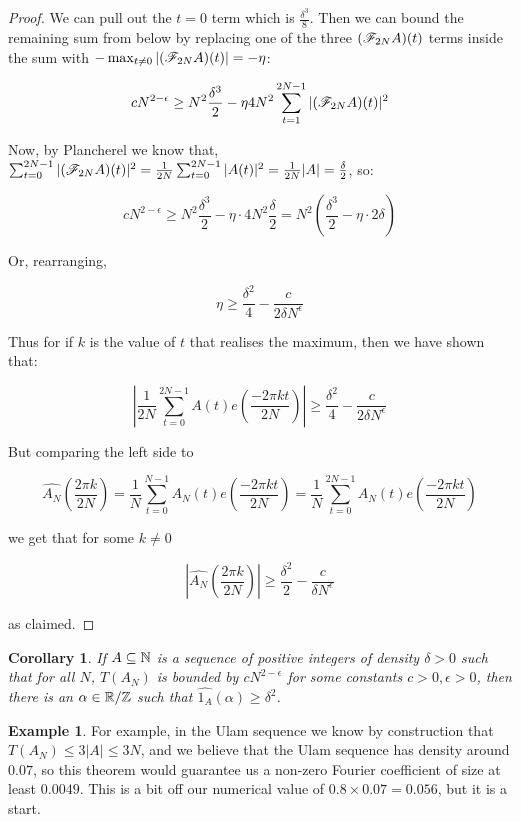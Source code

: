 \documentclass{article}
\newtheorem{corollary}{Corollary}[theorem]
\theoremstyle{definition}
\newtheorem{example}{Example}
\theoremstyle{remark}
\numberwithin{equation}{section}
\begin{document}
\begin{proof}
  We can pull out the $t = 0$ term which is $\frac{\delta^3}{8}$.  Then we can
  bound the remaining sum from below by replacing one of the three
  $(\mathscr{F}_{2N} A)(t)$ terms inside the sum with
  $-\max_{t\neq 0} |(\mathscr{F}_{2N} A)(t)| = -\eta$:
  
  \[cN^{2-\epsilon} \geq N^2 \frac{\delta^3}{2} - \eta 4 N^2 \sum_{t=1}^{2N-1} |(\mathscr{F}_{2N} A)(t)|^2\]

  Now, by Plancherel we know that,
  $\sum_{t=0}^{2N-1} |(\mathscr{F}_{2N}A)(t)|^2 = \frac{1}{2N}
  \sum_{t=0}^{2N-1} |A(t)|^2 = \frac{1}{2N} |A| = \frac{\delta}{2}$,
  so:

  \[cN^{2-\epsilon} \geq N^2 \frac{\delta^3}{2} - \eta \cdot 4N^2
    \frac{\delta}{2} = N^2\left(\frac{\delta^3}{2} - \eta\cdot 2
      \delta \right)\]

  Or, rearranging, 

  \[\eta \geq \frac{\delta^2}{4} - \frac{c}{2\delta N^\epsilon}\]

  Thus for if $k$ is the value of $t$ that realises the maximum, then we
  have shown that: 
  
  \[\left|\frac{1}{2N} \sum_{t=0}^{2N-1} A(t) e(\frac{-2\pi k
        t}{2N})\right| \geq \frac{\delta^2}{4} - \frac{c}{2\delta N^\epsilon}\]
  
  But comparing the left side to 
  
  \[\widehat{A_N}(\frac{2\pi k}{2N}) = \frac{1}{N}\sum_{t=0}^{N-1} A_N(t) e(\frac{-2\pi k
      t}{2N}) = \frac{1}{N}\sum_{t=0}^{2N-1} A_N(t) e(\frac{-2\pi k
      t}{2N})\]
  
  we get that for some $k \neq 0$

\[|\widehat{A_N}(\frac{2\pi k}{2N})| \geq \frac{\delta^2}{2} - \frac{c}{\delta
    N^\epsilon}\]

as claimed.
\end{proof}

\begin{corollary}\label{thm:alpha}
  If $A \subseteq \mathbb{N}$ is a sequence of positive integers of density
  $\delta > 0$ such that for all $N$, $T(A_N)$ is bounded by
  $c N^{2-\epsilon}$ for some constants $c > 0, \epsilon > 0$, then
  there is an $\alpha \in \mathbb{R}/\mathbb{Z}$ such that
  $\widehat{1_A}(\alpha) \geq \delta^2$.
\end{corollary}

\begin{example}
  For example, in the Ulam sequence we know by construction that
  $T(A_N) \leq 3|A| \leq 3N$, and we believe that the Ulam sequence
  has density around $0.07$, so this theorem would guarantee us a
  non-zero Fourier coefficient of size at least $0.0049$.  This is a
  bit off our numerical value of $0.8 \times 0.07 = 0.056$, but it is
  a start.
\end{example}
\end{document}

